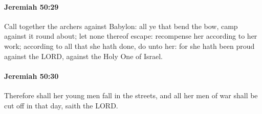 		\paragraph{Jeremiah 50:29} %
			\label{JEREMIAH-50-29}

			Call together the archers against Babylon: all ye that bend the bow, camp against it round about; let none thereof escape: recompense her according to her work; according to all that she hath done, do unto her: for she hath been proud against the LORD, against the Holy One of Israel.


		\paragraph{Jeremiah 50:30} %
			\label{JEREMIAH-50-30}

			Therefore shall her young men fall in the streets, and all her men of war shall be cut off in that day, saith the LORD.

